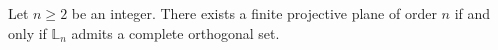 Let $n \geq 2$ be an integer. There exists a finite projective plane of order $n$ if and only if $\mathbb{L}_n$ admits a complete orthogonal set.

